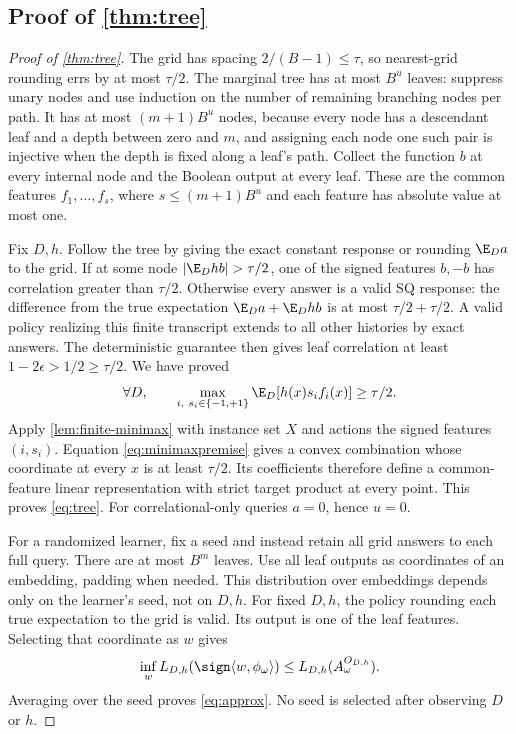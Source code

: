 \subsection[Proof of result tree]{Proof of \cref{thm:tree}}\label{proof:tree}
\begin{proof}[Proof of \cref{thm:tree}]
The grid has spacing $2/(B-1)\leq\tau$, so nearest-grid rounding errs by at most $\tau/2$. The marginal tree has at most $B^u$ leaves: suppress unary nodes and use induction on the number of remaining branching nodes per path. It has at most $(m+1)B^u$ nodes, because every node has a descendant leaf and a depth between zero and $m$, and assigning each node one such pair is injective when the depth is fixed along a leaf's path.
Collect the function $b$ at every internal node and the Boolean output at every leaf. These are the common features $f_1,\ldots,f_s$, where $s\leq(m+1)B^u$ and each feature has absolute value at most one.

Fix $D,h$. Follow the tree by giving the exact constant response or rounding $\E_Da$ to the grid. If at some node $|\E_D hb|>\tau/2$, one of the signed features $b,-b$ has correlation greater than $\tau/2$. Otherwise every answer is a valid SQ response: the difference from the true expectation $\E_Da+\E_D hb$ is at most $\tau/2+\tau/2$. A valid policy realizing this finite transcript extends to all other histories by exact answers. The deterministic guarantee then gives leaf correlation at least $1-2\epsilon>1/2\geq\tau/2$. We have proved
\begin{equation}\label{eq:minimaxpremise}
 \forall D,\qquad \max_{i,\ s_i\in\{-1,+1\}}\E_D[h(x)s_if_i(x)]\geq\tau/2.
\end{equation}
Apply \cref{lem:finite-minimax} with instance set $X$ and actions the signed features $(i,s_i)$. Equation \eqref{eq:minimaxpremise} gives a convex combination whose coordinate at every $x$ is at least $\tau/2$. Its coefficients therefore define a common-feature linear representation with strict target product at every point. This proves \eqref{eq:tree}. For correlational-only queries $a=0$, hence $u=0$.

For a randomized learner, fix a seed and instead retain all grid answers to each full query. There are at most $B^m$ leaves. Use all leaf outputs as coordinates of an embedding, padding when needed. This distribution over embeddings depends only on the learner's seed, not on $D,h$. For fixed $D,h$, the policy rounding each true expectation to the grid is valid. Its output is one of the leaf features. Selecting that coordinate as $w$ gives
\[
 \inf_w L_{D,h}(\sign\langle w,\phi_\omega\rangle)
 \leq L_{D,h}(A_\omega^{O_{D,h}}).
\]
Averaging over the seed proves \eqref{eq:approx}. No seed is selected after observing $D$ or $h$.
\end{proof}

